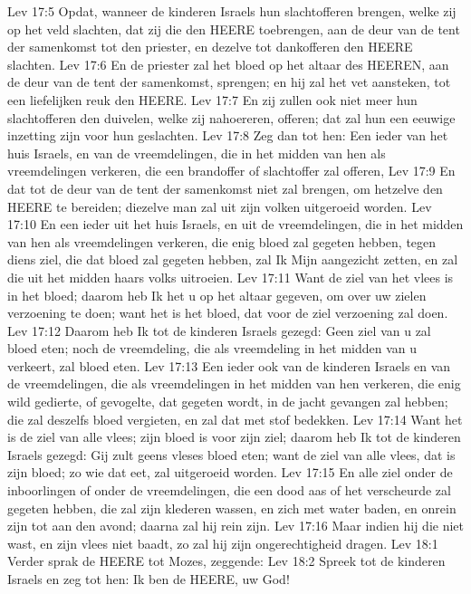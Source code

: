 Lev 17:5  Opdat, wanneer de kinderen Israels hun slachtofferen brengen, welke zij op het veld slachten, dat zij die den HEERE toebrengen, aan de deur van de tent der samenkomst tot den priester, en dezelve tot dankofferen den HEERE slachten.
Lev 17:6  En de priester zal het bloed op het altaar des HEEREN, aan de deur van de tent der samenkomst, sprengen; en hij zal het vet aansteken, tot een liefelijken reuk den HEERE.
Lev 17:7  En zij zullen ook niet meer hun slachtofferen den duivelen, welke zij nahoereren, offeren; dat zal hun een eeuwige inzetting zijn voor hun geslachten.
Lev 17:8  Zeg dan tot hen: Een ieder van het huis Israels, en van de vreemdelingen, die in het midden van hen als vreemdelingen verkeren, die een brandoffer of slachtoffer zal offeren,
Lev 17:9  En dat tot de deur van de tent der samenkomst niet zal brengen, om hetzelve den HEERE te bereiden; diezelve man zal uit zijn volken uitgeroeid worden.
Lev 17:10  En een ieder uit het huis Israels, en uit de vreemdelingen, die in het midden van hen als vreemdelingen verkeren, die enig bloed zal gegeten hebben, tegen diens ziel, die dat bloed zal gegeten hebben, zal Ik Mijn aangezicht zetten, en zal die uit het midden haars volks uitroeien.
Lev 17:11  Want de ziel van het vlees is in het bloed; daarom heb Ik het u op het altaar gegeven, om over uw zielen verzoening te doen; want het is het bloed, dat voor de ziel verzoening zal doen.
Lev 17:12  Daarom heb Ik tot de kinderen Israels gezegd: Geen ziel van u zal bloed eten; noch de vreemdeling, die als vreemdeling in het midden van u verkeert, zal bloed eten.
Lev 17:13  Een ieder ook van de kinderen Israels en van de vreemdelingen, die als vreemdelingen in het midden van hen verkeren, die enig wild gedierte, of gevogelte, dat gegeten wordt, in de jacht gevangen zal hebben; die zal deszelfs bloed vergieten, en zal dat met stof bedekken.
Lev 17:14  Want het is de ziel van alle vlees; zijn bloed is voor zijn ziel; daarom heb Ik tot de kinderen Israels gezegd: Gij zult geens vleses bloed eten; want de ziel van alle vlees, dat is zijn bloed; zo wie dat eet, zal uitgeroeid worden.
Lev 17:15  En alle ziel onder de inboorlingen of onder de vreemdelingen, die een dood aas of het verscheurde zal gegeten hebben, die zal zijn klederen wassen, en zich met water baden, en onrein zijn tot aan den avond; daarna zal hij rein zijn.
Lev 17:16  Maar indien hij die niet wast, en zijn vlees niet baadt, zo zal hij zijn ongerechtigheid dragen.
Lev 18:1  Verder sprak de HEERE tot Mozes, zeggende:
Lev 18:2  Spreek tot de kinderen Israels en zeg tot hen: Ik ben de HEERE, uw God!
